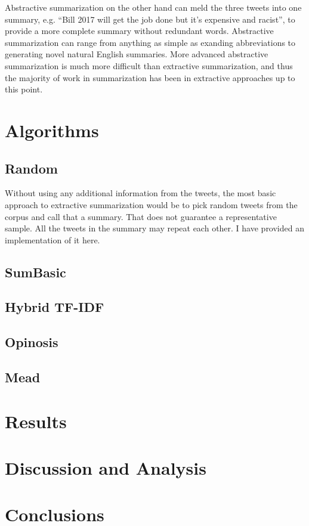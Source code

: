\documentclass[paper=letter, fontsize=12pt]{article}
\begin{document}
Abstractive summarization on the other hand can meld the three tweets into one summary, e.g. ``Bill 2017 will get the job done but it's expensive and racist'', to provide a more complete summary without redundant words. Abstractive summarization can range from anything as simple as exanding abbreviations to generating novel natural English summaries. More advanced abstractive summarization is much more difficult than extractive summarization, and thus the majority of work in summarization has been in extractive approaches up to this point.



\section{Algorithms}
\subsection{Random}
Without using any additional information from the tweets, the most basic approach to extractive summarization would be to pick random tweets from the corpus and call that a summary. That does not guarantee a representative sample. All the tweets in the summary may repeat each other. I have provided an implementation of it here. 
\subsection{SumBasic}

\subsection{Hybrid TF-IDF}
\subsection{Opinosis}
\subsection{Mead}

\section{Results}

\section{Discussion and Analysis}

\section{Conclusions}
\end{document}
